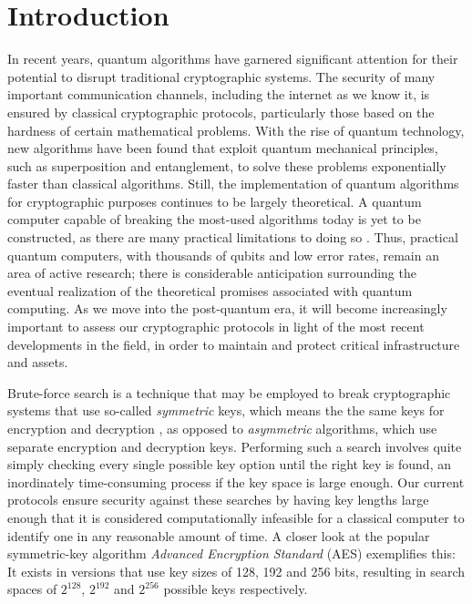 \chapter{Introduction}
In recent years, quantum algorithms have garnered significant attention for their potential to disrupt traditional cryptographic systems. The security of many important communication channels, including the internet as we know it, is ensured by classical cryptographic protocols, particularly those based on the hardness of certain mathematical problems. With the rise of quantum technology, new algorithms have been found that exploit quantum mechanical principles, such as superposition and entanglement, to solve these problems exponentially faster than classical algorithms. Still, the implementation of quantum algorithms for cryptographic purposes continues to be largely theoretical. A quantum computer capable of breaking the most-used algorithms today is yet to be constructed, as there are many practical limitations to doing so%
. Thus, practical quantum computers, with thousands of qubits and low error rates, remain an area of active research; there is considerable anticipation surrounding the eventual realization of the theoretical promises associated with quantum computing. As we move into the post-quantum era, it will become increasingly important to assess our cryptographic protocols in light of the most recent developments in the field, in order to maintain and protect critical infrastructure and assets.

Brute-force search is a technique that may be employed to break cryptographic systems that use so-called \emph{symmetric} keys, which means the the same keys for encryption and decryption \cite{symmetric}, as opposed to \emph{asymmetric} algorithms, which use separate encryption and decryption keys. Performing such a search involves quite simply checking every single possible key option until the right key is found, an inordinately time-consuming process if the key space is large enough. Our current protocols ensure security against these searches by having key lengths large enough that it is considered computationally infeasible for a classical computer to identify one in any reasonable amount of time. A closer look at the popular symmetric-key algorithm \emph{Advanced Encryption Standard} (AES) \cite{aes} exemplifies this: It exists in versions that use key sizes of 128, 192 and 256 bits, resulting in search spaces of $2^{128}$, $2^{192}$ and $2^{256}$ possible keys respectively.

